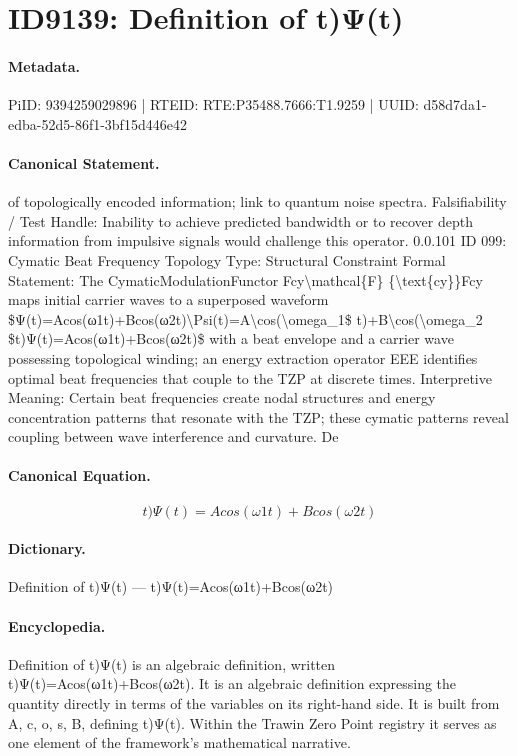 \section*{ID9139: Definition of t)Ψ(t)}
\paragraph{Metadata.}
PiID: 9394259029896 | RTEID: RTE:P35488.7666:T1.9259 | UUID: d58d7da1-edba-52d5-86f1-3bf15d446e42

\paragraph{Canonical Statement.}
of topologically encoded information; link to quantum noise spectra. Falsifiability / Test Handle: Inability to achieve predicted bandwidth or to recover depth information from impulsive signals would challenge this operator. 0.0.101 ID 099: Cymatic Beat Frequency Topology Type: Structural Constraint Formal Statement: The CymaticModulationFunctor Fcy\textbackslash{}mathcal\{F\} \{\textbackslash{}text\{cy\}\}Fcy maps initial carrier waves to a superposed waveform \$Ψ(t)=Acos(ω1t)+Bcos(ω2t)\textbackslash{}Psi(t)=A\textbackslash{}cos(\textbackslash{}omega\_1\$ t)+B\textbackslash{}cos(\textbackslash{}omega\_2 \$t)Ψ(t)=Acos(ω1t)+Bcos(ω2t)\$ with a beat envelope and a carrier wave possessing topological winding; an energy extraction operator EEE identifies optimal beat frequencies that couple to the TZP at discrete times. Interpretive Meaning: Certain beat frequencies create nodal structures and energy concentration patterns that resonate with the TZP; these cymatic patterns reveal coupling between wave interference and curvature. De

\paragraph{Canonical Equation.}
\[
t)Ψ(t)=Acos(ω1t)+Bcos(ω2t)
\]

\paragraph{Dictionary.}
Definition of t)Ψ(t) — t)Ψ(t)=Acos(ω1t)+Bcos(ω2t)

\paragraph{Encyclopedia.}
Definition of t)Ψ(t) is an algebraic definition, written t)Ψ(t)=Acos(ω1t)+Bcos(ω2t). It is an algebraic definition expressing the quantity directly in terms of the variables on its right-hand side. It is built from A, c, o, s, B, defining t)Ψ(t). Within the Trawin Zero Point registry it serves as one element of the framework's mathematical narrative.
